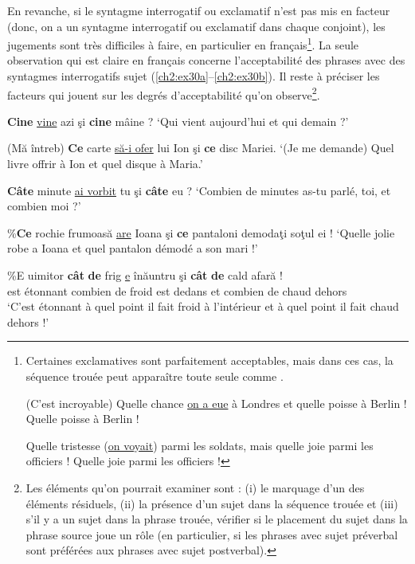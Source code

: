 En revanche, si le syntagme interrogatif ou exclamatif n’est pas mis en facteur (donc, on a un syntagme interrogatif ou exclamatif dans chaque conjoint), les jugements sont très difficiles à faire, en particulier en français\footnote{
Certaines exclamatives sont parfaitement acceptables, mais dans ces cas, la séquence trouée peut apparaître toute seule comme . 

\ea
\ea  (C’est incroyable) Quelle chance \uline{on a eue} à Londres et quelle poisse à Berlin !
\ex  Quelle poisse à Berlin !
\z
\z

\ea  
\ea Quelle tristesse (\uline{on voyait}) parmi les soldats, mais quelle joie parmi les officiers !
\ex  Quelle joie parmi les officiers !
\z
\zlast
}. La seule observation qui est claire en français concerne l’acceptabilité des phrases avec des syntagmes interrogatifs sujet (\ref{ch2:ex30a}--\ref{ch2:ex30b}). Il reste à préciser les facteurs qui jouent sur les degrés d’acceptabilité qu’on observe\footnote{
 Les éléments qu’on pourrait examiner sont : (i) le marquage d’un des éléments résiduels, (ii) la présence d’un sujet dans la séquence trouée et (iii) s’il y a un sujet dans la phrase trouée, vérifier si le placement du sujet dans la phrase source joue un rôle (en particulier, si les phrases avec sujet préverbal sont préférées aux phrases avec sujet postverbal).}.


\ea
\ea \textbf{Cine} \uline{vine} azi şi \textbf{cine} mâine ? 
\glt  ‘Qui vient aujourd’hui et qui demain ?’   

\ex  (Mă întreb) \textbf{Ce} carte \uline{să-i ofer} lui Ion şi \textbf{ce} disc Mariei.
\glt  ‘(Je me demande) Quel livre offrir à Ion et quel disque à Maria.’    

\ex  \textbf{Câte} minute \uline{ai vorbit} tu şi \textbf{câte} eu ? 
\glt  ‘Combien de minutes as-tu parlé, toi, et combien moi ?’       
\z
\z

\ea
\ea \%\textbf{Ce} rochie frumoasă \uline{are} Ioana şi \textbf{ce} pantaloni demodaţi soţul ei !
\glt  ‘Quelle jolie robe a Ioana et quel pantalon démodé a son mari !’    

\ex  
\gll \%E uimitor  \textbf{cât} \textbf{de}  frig  \uline{e}  înăuntru  şi  \textbf{cât} \textbf{de} cald {afară !}\\
est  étonnant  combien  de  froid  est  dedans  et  combien  de  chaud  dehors\\
\glt  ‘C’est étonnant à quel point il fait froid à l’intérieur et à quel point il fait chaud dehors !’
\z
\z


